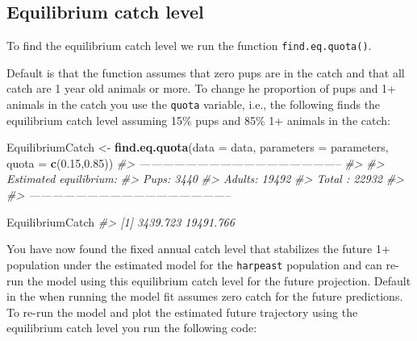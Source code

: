 \documentclass[
]{article}
\newenvironment{Shaded}{\begin{snugshade}}{\end{snugshade}}
\newcommand{\CommentTok}[1]{\textcolor[rgb]{0.56,0.35,0.01}{\textit{#1}}}
\newcommand{\DataTypeTok}[1]{\textcolor[rgb]{0.13,0.29,0.53}{#1}}
\newcommand{\FloatTok}[1]{\textcolor[rgb]{0.00,0.00,0.81}{#1}}
\newcommand{\KeywordTok}[1]{\textcolor[rgb]{0.13,0.29,0.53}{\textbf{#1}}}
\newcommand{\NormalTok}[1]{#1}
\newcommand{\StringTok}[1]{\textcolor[rgb]{0.31,0.60,0.02}{#1}}
\begin{document}
\hypertarget{equilibrium-catch-level}{%
\subsection{Equilibrium catch level}\label{equilibrium-catch-level}}

To find the equilibrium catch level we run the function
\texttt{find.eq.quota()}.

Default is that the function assumes that zero pups are in the catch and
that all catch are 1 year old animals or more. To change he proportion
of pups and 1+ animals in the catch you use the \texttt{quota} variable,
i.e., the following finds the equilibrium catch level assuming 15\% pups
and 85\% 1+ animals in the catch:

\begin{Shaded}
\begin{Highlighting}[]
\NormalTok{EquilibriumCatch <-}\StringTok{ }\KeywordTok{find.eq.quota}\NormalTok{(}\DataTypeTok{data =}\NormalTok{ data,}
                                  \DataTypeTok{parameters =}\NormalTok{ parameters, }
                                  \DataTypeTok{quota =} \KeywordTok{c}\NormalTok{(}\FloatTok{0.15}\NormalTok{,}\FloatTok{0.85}\NormalTok{))}
\CommentTok{#> -----------------------------------------------------}
\CommentTok{#> }
\CommentTok{#> Estimated equilibrium:}
\CommentTok{#> Pups:   3440 }
\CommentTok{#> Adults: 19492 }
\CommentTok{#> Total : 22932 }
\CommentTok{#> }
\CommentTok{#> -----------------------------------------------------}

\NormalTok{EquilibriumCatch}
\CommentTok{#> [1]  3439.723 19491.766}
\end{Highlighting}
\end{Shaded}

You have now found the fixed annual catch level that stabilizes the
future 1+ population under the estimated model for the \texttt{harpeast}
population and can re-run the model using this equilibrium catch level
for the future projection. Default in the when running the model fit
assumes zero catch for the future predictions. To re-run the model and
plot the estimated future trajectory using the equilibrium catch level
you run the following code:
\end{document}
